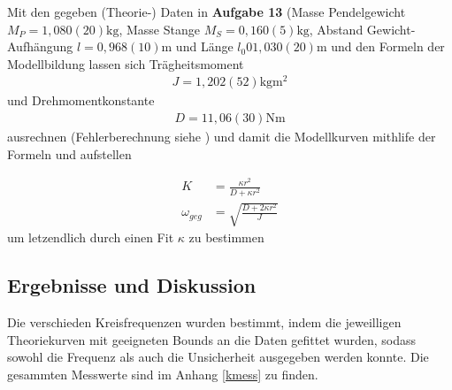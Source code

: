 \documentclass[11pt, a4paper]{article}
\begin{document}
    Mit den gegeben (Theorie-) Daten in \textbf{Aufgabe 13} \cite{pen} (Masse Pendelgewicht $M_P = 1,080(20)\si{\kilogram}$,
    Masse Stange $M_S = 0,160(5)\si{\kilogram}$, Abstand Gewicht-Aufhängung $l = 0,968(10)\si{\metre}$ und Länge $l_0 0 1,030(20)\si{\metre}$
    und den Formeln der Modellbildung \cite{modell}
    lassen sich Trägheitsmoment
    \begin{align}
        J = 1,202(52)\si{\kilogram\metre\squared} \label{J}
    \end{align}
    und Drehmomentkonstante
    \begin{align}
        D = 11,06(30)\si{\newton\metre} \label{D}
    \end{align} 
    ausrechnen (Fehlerberechnung siehe \cite[Formel (19)]{ABW}) und damit die Modellkurven
    mithlife der Formeln \cite[(30)]{pen} und \cite[(35)]{pen}
    aufstellen
    
    \begin{align}
        K &= \frac{\kappa r^2}{D + \kappa r^2} \label{Kkappa} \\
        \omega_{geg} &= \sqrt{\frac{D+2\kappa r^2}{J}} \label{Okappa}
    \end{align}
    um letzendlich durch einen Fit  $\kappa$ zu bestimmen

    \subsection{Ergebnisse und Diskussion}

    Die verschieden Kreisfrequenzen wurden bestimmt, indem die jeweilligen Theoriekurven mit geeigneten
    Bounds an die Daten gefittet wurden, sodass sowohl die Frequenz als auch die Unsicherheit ausgegeben
    werden konnte. Die gesammten Messwerte sind im Anhang \ref{kmess} zu finden.
\end{document}

